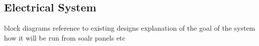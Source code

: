 \subsection{Electrical System}

block diagrams
reference to existing designs
explanation of the goal of the system
how it will be run from soalr panels
etc
